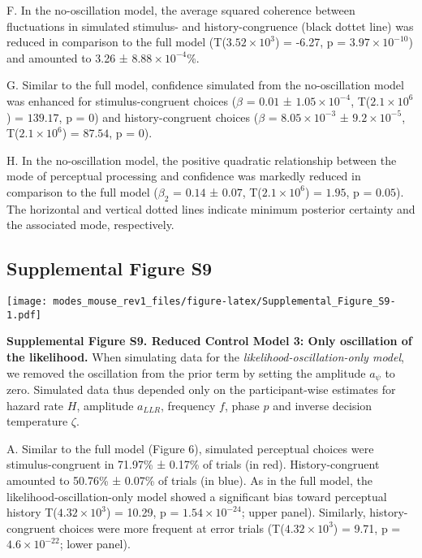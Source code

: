 \documentclass[
]{article}
\begin{document}
F. In the no-oscillation model, the average squared coherence between
fluctuations in simulated stimulus- and history-congruence (black dottet
line) was reduced in comparison to the full model
(T(\ensuremath{3.52\times 10^{3}}) = -6.27, p =
\(\ensuremath{3.97\times 10^{-10}}\)) and amounted to 3.26 ±
\ensuremath{8.88\times 10^{-4}}\%.

G. Similar to the full model, confidence simulated from the
no-oscillation model was enhanced for stimulus-congruent choices
(\(\beta\) = \(0.01\) ± \(\ensuremath{1.05\times 10^{-4}}\),
T(\(\ensuremath{2.1\times 10^{6}}\)) = \(139.17\), p = \(0\)) and
history-congruent choices (\(\beta\) =
\(\ensuremath{8.05\times 10^{-3}}\) ±
\(\ensuremath{9.2\times 10^{-5}}\), T(\(\ensuremath{2.1\times 10^{6}}\))
= \(87.54\), p = \(0\)).

H. In the no-oscillation model, the positive quadratic relationship
between the mode of perceptual processing and confidence was markedly
reduced in comparison to the full model (\(\beta_2\) = \(0.14\) ±
\(0.07\), T(\(\ensuremath{2.1\times 10^{6}}\)) = \(1.95\), p =
\(0.05\)). The horizontal and vertical dotted lines indicate minimum
posterior certainty and the associated mode, respectively.

\newpage

\hypertarget{supplemental-figure-s9}{%
\subsection{Supplemental Figure S9}\label{supplemental-figure-s9}}

\texttt{[image: modes\_mouse\_rev1\_files/figure-latex/Supplemental\_Figure\_S9-1.pdf]}

\textbf{Supplemental Figure S9. Reduced Control Model 3: Only
oscillation of the likelihood.} When simulating data for the
\emph{likelihood-oscillation-only model}, we removed the oscillation
from the prior term by setting the amplitude \(a_{\psi}\) to zero.
Simulated data thus depended only on the participant-wise estimates for
hazard rate \(H\), amplitude \(a_{LLR}\), frequency \(f\), phase \(p\)
and inverse decision temperature \(\zeta\).

A. Similar to the full model (Figure 6), simulated perceptual choices
were stimulus-congruent in 71.97\% ± 0.17\% of trials (in red).
History-congruent amounted to 50.76\% ± 0.07\% of trials (in blue). As
in the full model, the likelihood-oscillation-only model showed a
significant bias toward perceptual history
T(\ensuremath{4.32\times 10^{3}}) = 10.29, p =
\(\ensuremath{1.54\times 10^{-24}}\); upper panel). Similarly,
history-congruent choices were more frequent at error trials
(T(\ensuremath{4.32\times 10^{3}}) = 9.71, p =
\(\ensuremath{4.6\times 10^{-22}}\); lower panel).
\end{document}
